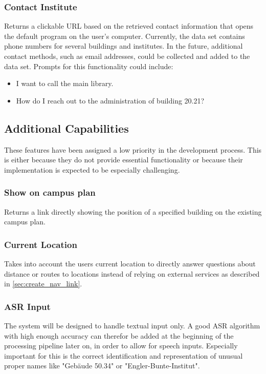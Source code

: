 \documentclass{article}
\begin{document}
\subsubsection{Contact Institute}
Returns a clickable URL based on the retrieved contact information that opens the default program on the user's computer. Currently, the data set contains phone numbers for several buildings and institutes. In the future, additional contact methods, such as email addresses, could be collected and added to the data set. Prompts for this functionality could include:
  \begin{itemize}
    \item I want to call the main library.
    \item How do I reach out to the administration of building 20.21?
  \end{itemize}

\subsection{Additional Capabilities}
These features have been assigned a low priority in the development process. This is either because they do not provide essential functionality or because their implementation is expected to be especially challenging.

\subsubsection{Show on campus plan}
Returns a link directly showing the position of a specified building on the existing campus plan.

\subsubsection{Current Location} \label{sec:curr_loc}
Takes into account the users current location to directly answer questions about distance or routes to locations instead of relying on external services as described in \ref{sec:create_nav_link}.

\subsubsection{ASR Input}
The system will be designed to handle textual input only. A good ASR algorithm with high enough accuracy can therefor be added at the beginning of the processing pipeline later on, in order to allow for speech inputs. Especially important for this is the correct identification and representation of unusual proper names like "Gebäude 50.34" or "Engler-Bunte-Institut".
\end{document}
